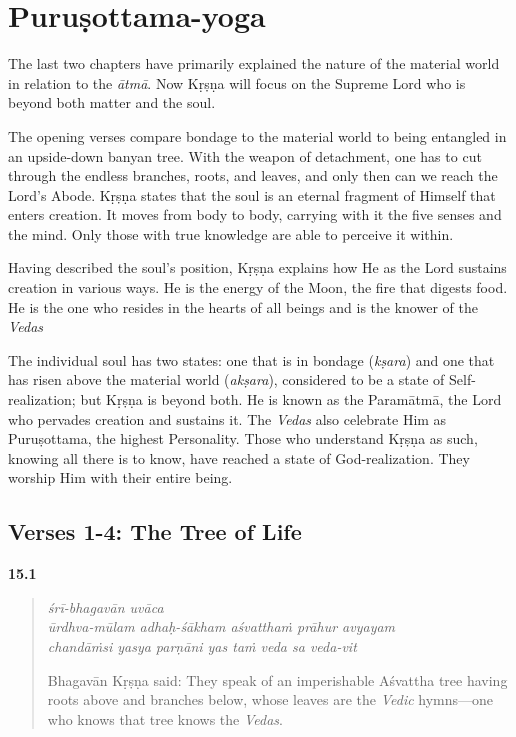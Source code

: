 \chapter{Puruṣottama-yoga}\label{chap-purusottama-yoga}

\noindent The last two chapters have primarily explained the nature of the material world in relation to the \textit{ātmā}. Now Kṛṣṇa will focus on the Supreme Lord who is beyond both matter and the soul.

The opening verses compare bondage to the material world to being entangled in an upside-down banyan tree. With the weapon of detachment, one has to cut through the endless branches, roots, and leaves, and only then can we reach the Lord’s Abode. Kṛṣṇa states that the soul is an eternal fragment of Himself that enters creation. It moves from body to body, carrying with it the five senses and the mind. Only those with true knowledge are able to perceive it within.

Having described the soul’s position, Kṛṣṇa explains how He as the Lord sustains creation in various ways. He is the energy of the Moon, the fire that digests food. He is the one who resides in the hearts of all beings and is the knower of the \textit{Vedas}

The individual soul has two states: one that is in bondage (\textit{kṣara}) and one that has risen above the material world (\textit{akṣara}), considered to be a state of Self-realization; but Kṛṣṇa is beyond both. He is known as the Paramātmā, the Lord who pervades creation and sustains it. The \textit{Vedas} also celebrate Him as Puruṣottama, the highest Personality. Those who understand Kṛṣṇa as such, knowing all there is to know, have reached a state of God-realization. They worship Him with their entire being.

\section{Verses 1-4: The Tree of Life}\label{sec-verses-1-4-the-tree-of-life}


\par\noindent\textbf{15.1}\par
\begin{verse}
\textit{śrī-bhagavān uvāca} \\
\textit{ūrdhva-mūlam adhaḥ-śākham aśvatthaṁ prāhur avyayam} \\
\textit{chandāṁsi yasya parṇāni yas taṁ veda sa veda-vit}

\noindent Bhagavān Kṛṣṇa said: They speak of an imperishable Aśvattha tree having roots above and branches below, whose leaves are the \textit{Vedic} hymns---one who knows that tree knows the \textit{Vedas}.
\end{verse}
\par



